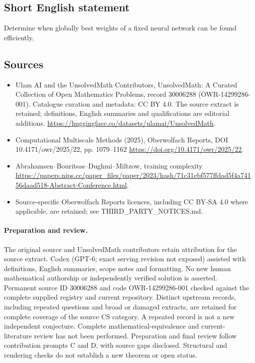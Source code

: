 \documentclass[11pt]{article}
\begin{document}
\subsection{Short English statement}
Determine when globally best weights of a fixed neural network can be found efficiently.
\subsection{Sources}
\begin{itemize}
\item[\hypertarget{source:30006288:1}{S1}] Ulam AI and the UnsolvedMath Contributors, UnsolvedMath: A Curated Collection of Open Mathematics Problems, record 30006288 (OWR-14299286-001). Catalogue curation and metadata: CC BY 4.0. The source extract is retained; definitions, English summaries and qualifications are editorial additions.
\url{https://huggingface.co/datasets/ulamai/UnsolvedMath}.
\item[\hypertarget{source:30006288:2}{S2}] Computational Multiscale Methods (2025), Oberwolfach Reports, DOI 10.4171/owr/2025/22, pp. 1079--1162
\url{https://doi.org/10.4171/owr/2025/22}.
\item[\hypertarget{source:30006288:3}{S3}] Abrahamsen--Bouritsas--Dughmi--Miltzow, training complexity
\url{https://papers.nips.cc/paper_files/paper/2023/hash/71c31ebf577ffdad5f4a74156daad518-Abstract-Conference.html}.
\item Source-specific Oberwolfach Reports licences, including CC BY-SA 4.0 where applicable, are retained; see THIRD\_PARTY\_NOTICES.md.
\end{itemize}
\paragraph{Preparation and review.}
The original source and UnsolvedMath contributors retain attribution for the source extract. Codex (GPT-6; exact serving revision not exposed) assisted with definitions, English summaries, scope notes and formatting. No new human mathematical authorship or independently verified solution is asserted. Permanent source ID 30006288 and code OWR-14299286-001 checked against the complete supplied registry and current repository. Distinct upstream records, including repeated questions and broad or damaged extracts, are retained for complete coverage of the source CS category. A repeated record is not a new independent conjecture. Complete mathematical-equivalence and current-literature review has not been performed. Preparation and final review follow contribution prompts C and D, with source gaps disclosed. Structural and rendering checks do not establish a new theorem or open status.
\label{end:30006288}
\end{document}
